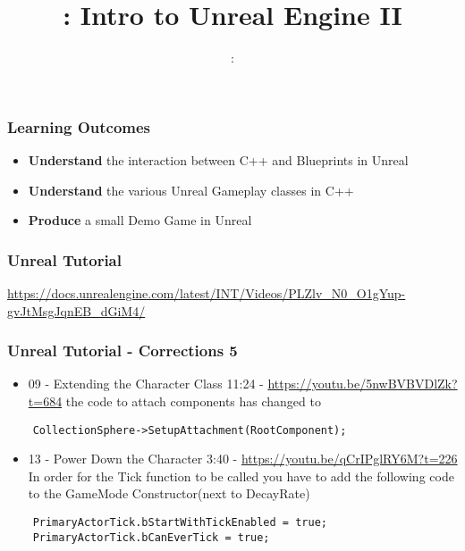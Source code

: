 \usepackage{../../beamerthemeFalmouthGamesAcademy}
\usepackage{multimedia}
\graphicspath{ {../../} }

\usepackage{textcomp}

\usepackage[normalem]{ulem}
\usepackage{wasysym}

\usepackage{pdfpages}

\usetikzlibrary{arrows,automata}







\title{\sessionnumber: Intro to Unreal Engine II}
\subtitle{\modulecode: \moduletitle}

\frame{\titlepage} 

\begin{frame}
	\frametitle{Learning Outcomes}
	\begin{itemize}
		\item \textbf{Understand} the interaction between C++ and Blueprints in Unreal
		\item \textbf{Understand} the various Unreal Gameplay classes in C++
		\item \textbf{Produce} a small Demo Game in Unreal
	\end{itemize}
\end{frame}

\begin{frame}
	\frametitle{Unreal Tutorial}
	\begin{center}
		\url{https://docs.unrealengine.com/latest/INT/Videos/PLZlv_N0_O1gYup-gvJtMsgJqnEB_dGiM4/}
	\end{center}
\end{frame}

\begin{frame}[fragile]
\frametitle{Unreal Tutorial - Corrections 5}
\begin{itemize}
	\item 09 - Extending the Character Class 11:24 - \url{https://youtu.be/5nwBVBVDlZk?t=684} the code to attach components has changed to
\end{itemize}
\begin{lstlisting}
	CollectionSphere->SetupAttachment(RootComponent);
\end{lstlisting}
\begin{itemize}
	\item 13 - Power Down the Character 3:40 - \url{https://youtu.be/qCrIPglRY6M?t=226} In order for the Tick function to be called you have to add the following code to the GameMode Constructor(next to DecayRate)
\end{itemize}
\begin{lstlisting}
	PrimaryActorTick.bStartWithTickEnabled = true;
	PrimaryActorTick.bCanEverTick = true;
\end{lstlisting}
\end{frame}


